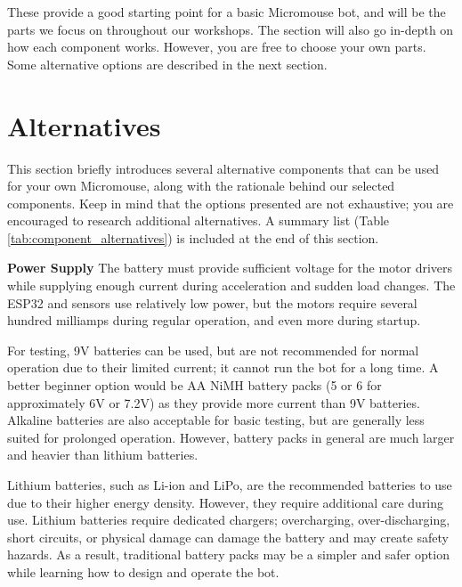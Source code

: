 \documentclass[11pt]{report}
\begin{document}
	\noindent
	These provide a good starting point for a basic Micromouse bot, and will be the parts we focus on 
	throughout our workshops. The  section will also go in-depth on how each
	component works. However, you are free to choose your own parts. Some alternative options are 
	described in the next section.

    \section{Alternatives} \label{sec:alternatives}
	This section briefly introduces several alternative components that can be used for your own Micromouse, 
	along with the rationale behind our selected components. Keep in mind that the options presented are
	not exhaustive; you are encouraged to research additional alternatives. A summary list 
	(Table \ref{tab:component_alternatives}) is included at the end of this section.
	\newline

	\newpage

	\noindent
	\textbf{Power Supply}
	\newline
	The battery must provide sufficient voltage for the motor drivers while supplying enough current during 
	acceleration and sudden load changes. The ESP32 and sensors use relatively low power, but the motors 
	require several hundred milliamps during regular operation, and even more during startup.  
	\newline

	\noindent
	For testing, 9V batteries can be used, but are not recommended for normal operation due to their limited 
	current; it cannot run the bot for a long time. A better beginner option would be AA NiMH battery packs 
	(5 or 6 for approximately 6V or 7.2V) as they provide more current than 9V batteries. Alkaline batteries 
	are also acceptable	for basic testing, but are generally less suited for prolonged operation. However, 
	battery packs in general are much larger and heavier than lithium batteries. 
	\newline

	\noindent
	Lithium batteries, such as Li-ion and LiPo, are the recommended batteries to use due to their higher 
	energy density. However, they require additional care during use. Lithium batteries require dedicated
	chargers; overcharging, over-discharging, short circuits, or physical damage can damage the battery 
	and may create safety hazards. As a result, traditional battery packs may be a simpler and safer option 
	while learning how to design and operate the bot.
	\newline
	
\end{document}
